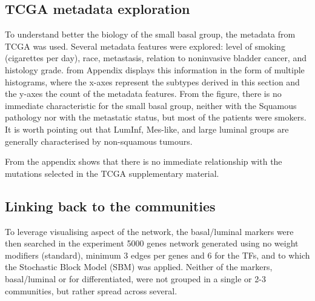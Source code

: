 \newpage

\subsection{TCGA metadata exploration} \label{s:N_I:sel_tfs_metadata}

To understand better the biology of the small basal group, the metadata from TCGA \citep{Cancer_Genome_Atlas_Research_Network2014-xp} was used. Several metadata features were explored: level of smoking (cigarettes per day), race, metastasis, relation to noninvasive bladder cancer, and histology grade.  from Appendix displays this information in the form of multiple histograms, where the x-axes represent the subtypes derived in this section and the y-axes the count of the metadata features. From the figure, there is no immediate characteristic for the small basal group, neither with the Squamous pathology nor with the metastatic status, but most of the patients were smokers. It is worth pointing out that LumInf, Mes-like, and large luminal groups are generally characterised by non-squamous tumours. 

From the appendix  shows that there is no immediate relationship with the mutations selected in the TCGA supplementary material.


\subsection{Linking back to the communities} \label{s:N_I:sel_tfs_net}

To leverage visualising aspect of the network, the basal/luminal markers were then searched in the experiment 5000 genes network generated using no weight modifiers (standard), minimum 3 edges per genes and 6 for the TFs, and to which the Stochastic Block Model (SBM) was applied. Neither of the markers, basal/luminal or for differentiated, were not grouped in a single or 2-3 communities, but rather spread across several.


